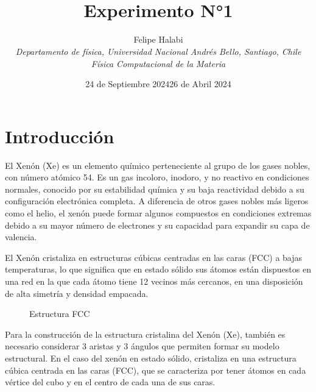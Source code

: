 \documentclass[10pt,letterpaper,twocolumn]{article}
\title{\noindent\\[-4cm]\bfseries Experimento N°1}
\author{Felipe Halabi
\\\small\itshape \textit{Departamento de física, Universidad Nacional Andrés Bello, Santiago, Chile}
\\\small\itshape Física Computacional de la Materia}
\date{24 de Septiembre 2024}
\date{26 de Abril 2024}
\begin{document}
\renewcommand{\tablename}{Tabla}
\section*{Introducción}
El Xenón (Xe) es un elemento químico perteneciente al grupo de los gases nobles, con número 
atómico 54. Es un gas incoloro, inodoro, y no reactivo en condiciones normales, conocido por 
su estabilidad química y su baja reactividad debido a su configuración electrónica completa. 
A diferencia de otros gases nobles más ligeros como el helio, el xenón puede formar algunos 
compuestos en condiciones extremas debido a su mayor número de electrones y su capacidad para 
expandir su capa de valencia.

El Xenón cristaliza en estructuras cúbicas centradas en las caras (FCC) a bajas temperaturas, 
lo que significa que en estado sólido sus átomos están dispuestos en una red en la que cada 
átomo tiene 12 vecinos más cercanos, en una disposición de alta simetría y densidad empacada.

\begin{figure}[h!]
    \centering
    
    \vspace*{-5mm}
    \caption{Estructura FCC}
\end{figure}

Para la construcción de la estructura cristalina del Xenón (Xe), también es necesario considerar 
3 aristas y 3 ángulos que permiten formar su modelo estructural. En el caso del xenón en estado 
sólido, cristaliza en una estructura cúbica centrada en las caras (FCC), que se caracteriza por 
tener átomos en cada vértice del cubo y en el centro de cada una de sus caras.
\end{document}
